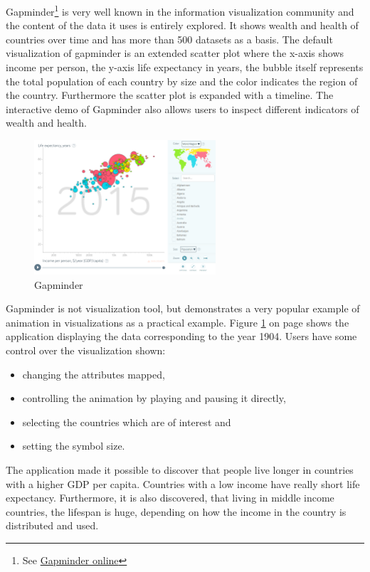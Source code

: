 Gapminder\footnote{See \href{https://www.gapminder.org/}{Gapminder online}} is very well known in the information visualization community and the content of the data it uses is entirely explored. It shows wealth and health of countries over time and has more than 500 datasets as a basis. The default visualization of gapminder is an extended scatter plot where the x-axis shows income per person, the y-axis life expectancy in years, the bubble itself represents the total population of each country by size and the color indicates the region of the country. Furthermore the scatter plot is expanded with a timeline. The interactive demo of Gapminder also allows users to inspect different indicators of wealth and health.

\begin{figure}[!htb]
\centering
\includegraphics[height=5cm]{images/methods/related/gapminder.png}
\caption[
    Gapminder
]{Gapminder}
\label{fig:gapminder}
\end{figure}

Gapminder is not visualization tool, but demonstrates a very popular example of animation in visualizations as a practical example. Figure \ref{fig:gapminder} on page \pageref{fig:gapminder} shows the application displaying the data corresponding to the year 1904. Users have some control over the visualization shown:
\begin{itemize}
\item changing the attributes mapped,
\item controlling the animation by playing and pausing it directly,
\item selecting the countries which are of interest and
\item setting the symbol size.
\end{itemize}

The application made it possible to discover that people live longer in countries with a higher \ac{GDP} per capita. Countries with a low income have really short life expectancy. Furthermore, it is also discovered, that living in middle income countries, the lifespan is huge, depending on how the income in the country is distributed and used.
